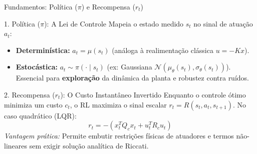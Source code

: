 \documentclass[11pt, aspectratio=169]{beamer}
\begin{document}
\begin{frame}{Fundamentos: Política ($\pi$) e Recompensa ($r_t$)}
    \begin{block}{1. Política ($\pi$): A Lei de Controle}
        Mapeia o estado medido $s_t$ no sinal de atuação $a_t$:
        \begin{itemize}
            \item \textbf{Determinística:} $a_t = \mu(s_t)$ (análoga à realimentação clássica $u = -Kx$).
            \item \textbf{Estocástica:} $a_t \sim \pi(\cdot \mid s_t)$ (ex: Gaussiana $\mathcal{N}(\mu_\theta(s_t), \sigma_\theta(s_t))$). Essencial para \textbf{exploração} da dinâmica da planta e robustez contra ruídos.
        \end{itemize}
    \end{block}

    \begin{alertblock}{2. Recompensa ($r_t$): O Custo Instantâneo Invertido}
        Enquanto o controle ótimo minimiza um custo $c_t$, o RL maximiza o sinal escalar $r_t = R(s_t, a_t, s_{t+1})$. No caso quadrático (LQR):
        \[ r_t = -\left( x_t^T Q_c x_t + u_t^T R_c u_t \right) \]
        \textit{Vantagem prática:} Permite embutir restrições físicas de atuadores e termos não-lineares sem exigir solução analítica de Riccati.
    \end{alertblock}
\end{frame}
\end{document}
